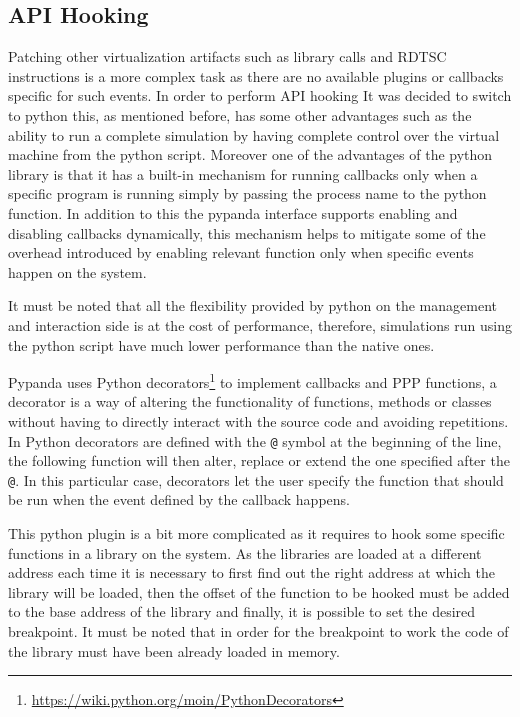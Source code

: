 \subsection{API Hooking}

Patching other virtualization artifacts such as library calls and RDTSC instructions is a more complex task as there are no available plugins or callbacks specific for such events. In order to perform API hooking It was decided to switch to python this, as mentioned before, has some other advantages such as the ability to run a complete simulation by having complete control over the virtual machine from the python script. Moreover one of the advantages of the python library is that it has a built-in mechanism for running callbacks only when a specific program is running simply by passing the process name to the python function. In addition to this the pypanda interface supports enabling and disabling callbacks dynamically, this mechanism helps to mitigate some of the overhead introduced by enabling relevant function only when specific events happen on the system.

It must be noted that all the flexibility provided by python on the management and interaction side is at the cost of performance, therefore, simulations run using the python script have much lower performance than the native ones. 

Pypanda uses Python decorators\footnote{\url{https://wiki.python.org/moin/PythonDecorators}} to implement callbacks and PPP functions, a decorator is a way of altering the functionality of functions, methods or classes without having to directly interact with the source code and avoiding repetitions. In Python decorators are defined with the \lstinline{@} symbol at the beginning of the line, the following function will then alter, replace or extend the one specified after the \lstinline{@}. In this particular case, decorators let the user specify the function that should be run when the event defined by the callback happens. 

This python plugin is a bit more complicated as it requires to hook some specific functions in a library on the system. As the libraries are loaded at a different address each time it is necessary to first find out the right address at which the library will be loaded, then the offset of the function to be hooked must be added to the base address of the library and finally, it is possible to set the desired breakpoint. It must be noted that in order for the breakpoint to work the code of the library must have been already loaded in memory. 

